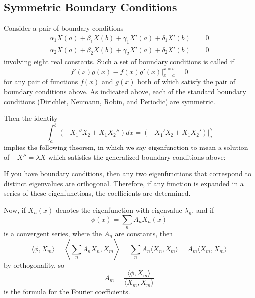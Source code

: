\documentclass[12pt, a4paper, oneside, openright, titlepage]{book}
\begin{document}
\subsection{Symmetric Boundary Conditions}

Consider a pair of boundary conditions \begin{align*}
    \alpha_1X(a)+\beta_1X(b)+\gamma_1X'(a)+\delta_1X'(b) &= 0 \\
    \alpha_2X(a)+\beta_2X(b)+\gamma_2X'(a)+\delta_2X'(b) &= 0
\end{align*}
involving eight real constants. Such a set of boundary conditions is called  if \begin{equation}
    \boxed{f'(x)g(x) - f(x)g'(x)\Bigg\rvert_{x=a}^{x=b} = 0}
\end{equation}
for any pair of functions $f(x)$ and $g(x)$ both of which satisfy the pair of boundary conditions above. As indicated above, each of the standard boundary conditions (Dirichlet, Neumann, Robin, and Periodic) are symmetric.

Then the identity \begin{equation*}
    \int_a^b(-X_1''X_2+X_1X_2'')dx = (-X_1'X_2+X_1X_2')\Bigg\rvert_a^b
\end{equation*}
implies the following theorem, in which we say eigenfunction to mean a solution of $-X''=\lambda X$ which satisfies the generalized boundary conditions above:

\begin{thm}
    If you have  boundary conditions, then any two eigenfunctions that correspond to distinct eigenvalues are orthogonal. Therefore, if any function is expanded in a series of these eigenfunctions, the coefficients are determined.
\end{thm}

Now, if $X_n(x)$ denotes the eigenfunction with eigenvalue $\lambda_n$, and if \begin{equation*}
    \phi(x) = \sum_{n}A_nX_n(x)
\end{equation*}
is a convergent series, where the $A_n$ are constants, then \begin{equation*}
    \langle \phi,X_m\rangle = \left\langle\sum_{n}A_nX_n,X_m\right\rangle = \sum_{n}A_n\langle X_n,X_m\rangle = A_m\langle X_m, X_m\rangle
\end{equation*}
by orthogonality, so \begin{equation*}
    A_m = \frac{\langle \phi,X_m\rangle}{\langle X_m,X_m\rangle}
\end{equation*}
is the formula for the Fourier coefficients.
\end{document}
